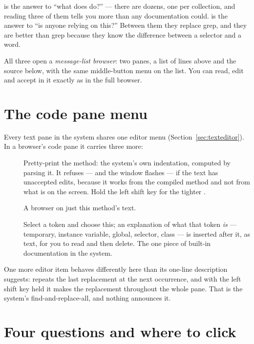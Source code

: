 \begin{stnote}
 is the answer to ``what does  do?'' --- there are
dozens, one per collection, and reading three of them tells you more than any
documentation could.  is the answer to ``is anyone relying on
this?'' Between them they replace grep, and they are better than grep because
they know the difference between a selector and a word.
\end{stnote}

All three open a \emph{message-list browser}: two panes, a list of
 lines above and the source below, with the same
middle-button menu on the list. You can read, edit and accept in it exactly as
in the full browser.

\section{The code pane menu}

Every text pane in the system shares one editor menu
(Section~\ref{sec:texteditor}). In a browser's code pane it carries three
more:

\begin{description}
\item[] Pretty-print the method: the system's own indentation,
  computed by parsing it. It refuses --- and the window flashes --- if the
  text has unaccepted edits, because it works from the compiled method and not
  from what is on the screen. Hold the left shift key for the tighter
  .
\item[] A browser on just this method's text.
\item[] Select a token and choose this; an explanation of what
  that token \emph{is} --- temporary, instance variable, global, selector,
  class --- is inserted after it, as text, for you to read and then delete.
  The one piece of built-in documentation in the system.
\end{description}

One more editor item behaves differently here than its one-line description
suggests:  repeats the last replacement at the next occurrence, and
with the left shift key held it makes the replacement throughout the whole
pane. That is the system's find-and-replace-all, and nothing announces it.

\section{Four questions and where to click}

